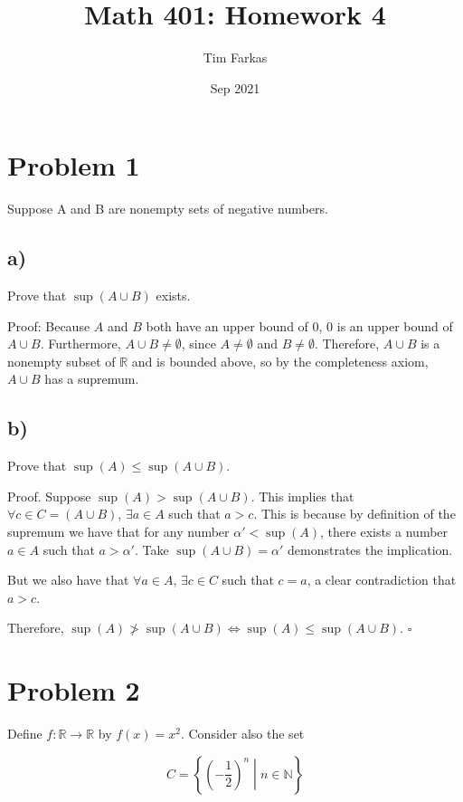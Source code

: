 \documentclass{article}
\title{Math 401: Homework 4}
\author{Tim Farkas}
\date{Sep 2021}
\newcommand{\R}{\mathbb{R}}
\newcommand{\N}{\mathbb{N}}
\begin{document}
\maketitle

\section*{Problem 1}

Suppose A and B are nonempty sets of negative numbers. 

\subsection*{a)}

Prove that $\sup(A \cup B)$ exists. 

Proof: Because $A$ and $B$ both have an upper bound of 0, 0 is an upper bound of $A \cup B$. 
Furthermore, $A \cup B \neq \emptyset$, since $A \neq \emptyset$ and $B \neq \emptyset$. 
Therefore, $A \cup B$ is a nonempty subset of $\R$ and is bounded above, so by the completeness axiom, $A \cup B$ has a supremum. 

\subsection*{b)}

Prove that $\sup(A) \leq \sup(A \cup B)$. 

Proof. Suppose $\sup(A) > \sup(A \cup B)$.
This implies that $\forall c \in C = (A \cup B)$,  $\exists a \in A$ such that $a > c$. 
This is because by definition of the supremum we have that for any number $\alpha' < \sup(A)$, there exists a number $a \in A$ such that $a > \alpha'$. Take $\sup(A\cup B) = \alpha'$ demonstrates the implication.    

But we also have that $\forall a \in A$, $\exists c \in C$ such that $c = a$, a clear contradiction that $a > c$. 

Therefore, $\sup(A) \ngtr \sup(A \cup B) \Leftrightarrow \sup(A) \leq \sup(A \cup B)$. $\square$

\section*{Problem 2}

Define $f: \R \rightarrow \R$ by $f(x) = x^2$. Consider also the set 

\begin{equation*}
    C = \left\{\left(-\frac{1}{2}\right)^n \middle| n \in \N \right\}
\end{equation*}
\end{document}

